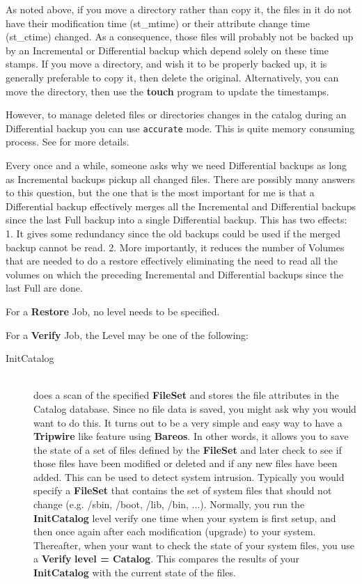 \begin{description}
\begin{description}
As noted above, if you move a directory rather than copy it, the
files in it do not have their modification time (st\_mtime) or
their attribute change time (st\_ctime) changed.  As a
consequence, those files will probably not be backed up by an
Incremental or Differential backup which depend solely on these
time stamps.  If you move a directory, and wish it to be
properly backed up, it is generally preferable to copy it, then
delete the original. Alternatively, you can move the directory, then
use the {\bf touch} program to update the timestamps.

However, to manage deleted files or directories changes in the
catalog during an Differential backup you can use \texttt{accurate}
mode. This is quite memory consuming process. See  for more details.

Every once and a while, someone asks why we need Differential
backups as long as Incremental backups pickup all changed files.
There are possibly many answers to this question, but the one
that is the most important for me is that a Differential backup
effectively merges
all the Incremental and Differential backups since the last Full backup
into a single Differential backup.  This has two effects: 1.  It gives
some redundancy since the old backups could be used if the merged backup
cannot be read.  2.  More importantly, it reduces the number of Volumes
that are needed to do a restore effectively eliminating the need to read
all the volumes on which the preceding Incremental and Differential
backups since the last Full are done.

\end{description}

For a {\bf Restore} Job, no level needs to be specified.

For a {\bf Verify} Job, the Level may be one of the  following:

\begin{description}

\item [InitCatalog] \hfill \\
does a scan of the specified {\bf FileSet} and stores the file
attributes in the Catalog database.  Since no file data is saved, you
might ask why you would want to do this.  It turns out to be a very
simple and easy way to have a {\bf Tripwire} like feature using {\bf
Bareos}.  In other words, it allows you to save the state of a set of
files defined by the {\bf FileSet} and later check to see if those files
have been modified or deleted and if any new files have been added.
This can be used to detect system intrusion.  Typically you would
specify a {\bf FileSet} that contains the set of system files that
should not change (e.g.  /sbin, /boot, /lib, /bin, ...).  Normally, you
run the {\bf InitCatalog} level verify one time when your system is
first setup, and then once again after each modification (upgrade) to
your system.  Thereafter, when your want to check the state of your
system files, you use a {\bf Verify} {\bf level = Catalog}.  This
compares the results of your {\bf InitCatalog} with the current state of
the files.


\end{description}
\end{description}

